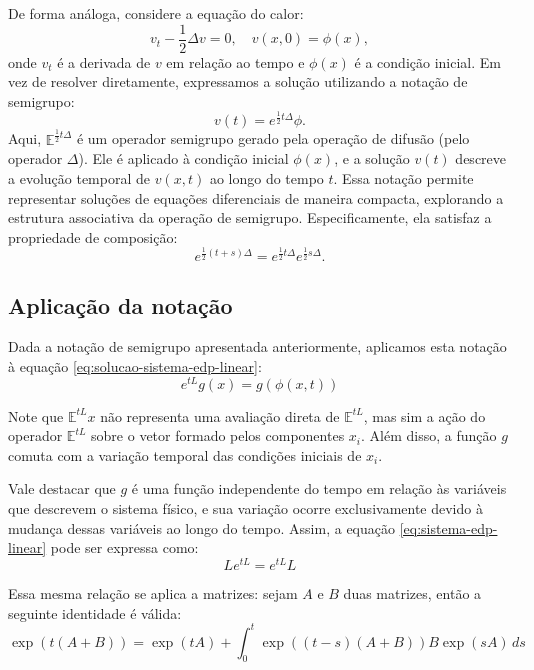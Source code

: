 De forma análoga, considere a equação do calor:
\begin{equation*}
	v_t - \frac{1}{2} \Delta v = 0, \quad v(x, 0) = \phi(x),
\end{equation*}
onde $v_t$ é a derivada de $v$ em relação ao tempo e $\phi(x)$ é a condição inicial. Em vez de resolver diretamente, expressamos a solução utilizando a notação de semigrupo:
\begin{equation*}
	v(t) = e^{\frac{1}{2}t \Delta} \phi.
\end{equation*}
Aqui, $\mathbb{E}^{\frac{1}{2}t \Delta}$ é um operador semigrupo gerado pela operação de difusão (pelo operador $\Delta$). Ele é aplicado à condição inicial $\phi(x)$, e a solução $v(t)$ descreve a evolução temporal de $v(x,t)$ ao longo do tempo $t$. Essa notação permite representar soluções de equações diferenciais de maneira compacta, explorando a estrutura associativa da operação de semigrupo. Especificamente, ela satisfaz a propriedade de composição:
\begin{equation*}
	e^{\frac{1}{2}(t+s)\Delta} = e^{\frac{1}{2}t \Delta} e^{\frac{1}{2}s \Delta}.
\end{equation*}

\subsection{Aplicação da notação}
Dada a notação de semigrupo apresentada anteriormente, aplicamos esta notação à equação \eqref{eq:solucao-sistema-edp-linear}:
\begin{equation}
	e^{tL}g(x) = g(\phi(x,t))
	\label{eq:solucao-sistema-edp-linear-semigrupo}
\end{equation}

Note que $\mathbb{E}^{tL}x$ não representa uma avaliação direta de $\mathbb{E}^{tL}$, mas sim a ação do operador $\mathbb{E}^{tL}$ sobre o vetor formado pelos componentes $x_i$. Além disso, a função $g$ comuta com a variação temporal das condições iniciais de $x_i$. 

Vale destacar que $g$ é uma função independente do tempo em relação às variáveis que descrevem o sistema físico, e sua variação ocorre exclusivamente devido à mudança dessas variáveis ao longo do tempo. Assim, a equação \eqref{eq:sistema-edp-linear} pode ser expressa como:
\begin{equation}
	Le^{tL} = e^{tL}L
\end{equation}

Essa mesma relação se aplica a matrizes: sejam $A$ e $B$ duas matrizes, então a seguinte identidade é válida:
\begin{equation}
	\exp(t(A+B)) = \exp(tA) + \int_0^t \exp\left((t-s)(A+B)\right)B\exp(sA) \, ds
	\label{eq:formula-de-duhamel}
\end{equation}

